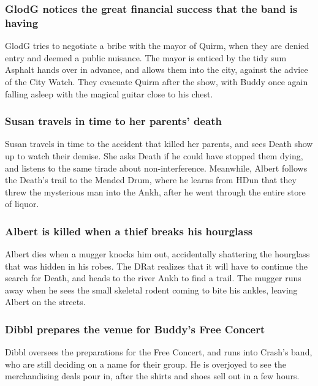 \subsubsection{\Gls{GlodG} notices the great financial success that the band is having}
\Gls{GlodG} tries to negotiate a bribe with the mayor of Quirm, when they are denied entry and
deemed a public nuisance. The mayor is enticed by the tidy sum \Gls{Asphalt} hands over in advance,
and allows them into the city, against the advice of the City Watch. They evacuate Quirm after the
show, with \Gls{Buddy} once again falling asleep with the magical guitar close to his chest.

\subsubsection{\Gls{Susan} travels in time to her parents' death}
\Gls{Susan} travels in time to the accident that killed her parents, and sees \Gls{Death} show up
to watch their demise. She asks \Gls{Death} if he could have stopped them dying, and listens to the
same tirade about non-interference. Meanwhile, \Gls{Albert} follows the \Gls{Death}'s trail to the
Mended Drum, where he learns from \Gls{HDun} that they threw the mysterious man into the Ankh, after
he went through the entire store of liquor.

\subsubsection{\Gls{Albert} is killed when a thief breaks his hourglass}
\Gls{Albert} dies when a mugger knocks him out, accidentally shattering the hourglass that was
hidden in his robes. The \Gls{DRat} realizes that it will have to continue the search for
\Gls{Death}, and heads to the river Ankh to find a trail. The mugger runs away when he sees the
small skeletal rodent coming to bite his ankles, leaving \Gls{Albert} on the streets.

\subsubsection{\Gls{Dibbl} prepares the venue for \Gls{Buddy}'s Free Concert}
\Gls{Dibbl} oversees the preparations for the Free Concert, and runs into \Gls{Crash}'s band, who
are still deciding on a name for their group. He is overjoyed to see the merchandising deals pour
in, after the shirts and shoes sell out in a few hours.

\subsection{}
